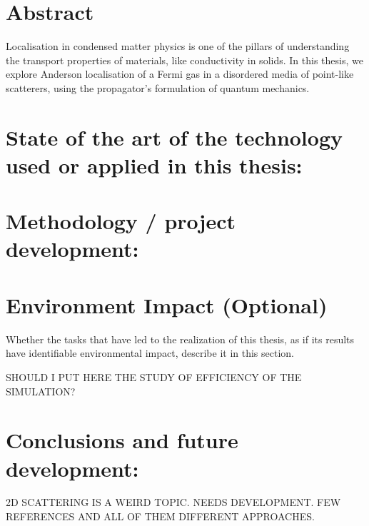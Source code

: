 \documentclass[a4paper,12pt]{article}
\begin{document}
\newpage


\clearpage
\newpage
\section*{Abstract}

{Localisation in condensed matter physics is one of the pillars of understanding the transport properties of materials, like conductivity in solids. In this thesis, we explore Anderson localisation of a Fermi gas in a disordered media of point-like scatterers, using the propagator's formulation of quantum mechanics.}



\clearpage\section{State of the art of the technology used or applied in this thesis:}

\clearpage\section{Methodology / project development: }





\clearpage

\section[Environment Impact (Optional)]{{Environment Impact (Optional)}}

{Whether the tasks that have led to the realization of this thesis, as if its results have identifiable environmental
impact, describe it in this section.}

SHOULD I PUT HERE THE STUDY OF EFFICIENCY OF THE SIMULATION?

\clearpage
\section{Conclusions and future development: }

2D SCATTERING IS A WEIRD TOPIC. NEEDS DEVELOPMENT. FEW REFERENCES AND ALL OF THEM DIFFERENT APPROACHES.

\newpage

\medskip



\clearpage
\newpage

\begin{appendices}





\end{appendices}
\end{document}
